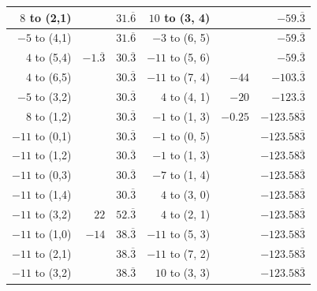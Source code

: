 \begin{appendices}
\begin{table}[H]
\begin{tabular}{rrrrrr}
          $8$ to (2,1)  &          &  $31.\overline6$     &   $10$ to (3, 4) &                    &  $-59.\overline3$    \\ \hline
          $-5$ to (4,1)  &          &  $31.\overline6$     &   $-3$ to (6, 5) &                    &  $-59.\overline3$    \\ \hline
          $4$ to (5,4)  & $-1.\overline3$  &  $30.\overline3$    &   $-11$ to (5, 6) &                    &  $-59.\overline3$    \\ \hline
          $4$ to (6,5)  &                  &  $30.\overline3$    &   $-11$ to (7, 4) & $-44$                    &  $-103.\overline3$    \\ \hline
          $-5$ to (3,2)  &                  &  $30.\overline3$    &   $4$ to (4, 1) & $-20$                    &  $-123.\overline3$    \\ \hline
          $8$ to (1,2)  &                  &  $30.\overline3$    &   $-1$ to (1, 3) & $-0.25$                    &  $-123.58\overline3$    \\ \hline
          $-11$ to (0,1)  &                  &  $30.\overline3$    &   $-1$ to (0, 5) &                            &  $-123.58\overline3$    \\ \hline
          $-11$ to (1,2)  &                  &  $30.\overline3$    &   $-1$ to (1, 3) &                            &  $-123.58\overline3$    \\ \hline
          $-11$ to (0,3)  &                  &  $30.\overline3$    &   $-7$ to (1, 4) &                            &  $-123.58\overline3$    \\ \hline
          $-11$ to (1,4)  &                  &  $30.\overline3$    &   $4$ to (3, 0) &                            &  $-123.58\overline3$    \\ \hline
          $-11$ to (3,2)  & $22$                  &  $52.\overline3$    &   $4$ to (2, 1) &                            &  $-123.58\overline3$    \\ \hline
          $-11$ to (1,0)  & $-14$                  &  $38.\overline3$    &   $-11$ to (5, 3) &                            &  $-123.58\overline3$    \\ \hline
          $-11$ to (2,1)  &                        &  $38.\overline3$    &   $-11$ to (7, 2) &                            &  $-123.58\overline3$    \\ \hline
          $-11$ to (3,2)  &                        &  $38.\overline3$    &   $10$ to (3, 3) &                            &  $-123.58\overline3$    \\ \hline

\end{tabular}
\end{table}
\end{appendices}
